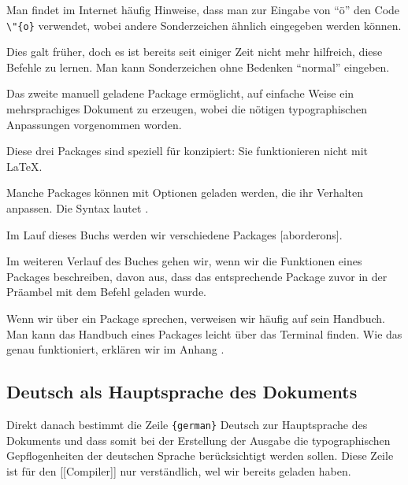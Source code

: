 \begin{plusloins}
Man findet im Internet häufig Hinweise, dass man zur Eingabe von \enquote{ö} den Code \verb|\"{o}| verwendet, wobei andere Sonderzeichen ähnlich eingegeben werden können. 

Dies galt früher, doch es ist bereits seit einiger Zeit nicht mehr hilfreich, diese Befehle zu lernen. Man kann Sonderzeichen ohne Bedenken \enquote{normal} eingeben. 
\end{plusloins}

Das zweite manuell geladene Package  ermöglicht, auf einfache Weise ein mehrsprachiges Dokument zu erzeugen, wobei die nötigen typographischen Anpassungen vorgenommen worden.

Diese drei Packages sind speziell für \XeLaTeX konzipiert: Sie funktionieren nicht mit  \LaTeX.

Manche Packages können mit Optionen geladen werden, die ihr Verhalten anpassen. Die Syntax lautet .

Im Lauf dieses Buchs werden wir verschiedene Packages [aborderons].


\begin{attention}
Im weiteren Verlauf des Buches gehen wir, wenn wir die Funktionen eines Packages beschreiben, davon aus, dass das entsprechende Package zuvor in der Präambel mit dem Befehl  geladen wurde.
\end{attention}

\begin{plusloins}
Wenn wir über ein Package sprechen, verweisen wir häufig auf sein Handbuch. Man kann das Handbuch eines Packages  leicht über das Terminal finden. Wie das genau funktioniert, erklären wir im Anhang .
\end{plusloins}

\subsection{Deutsch als Hauptsprache des Dokuments\label{french}}

Direkt danach bestimmt die Zeile \verb|{german}| Deutsch zur Hauptsprache des Dokuments und dass somit bei der Erstellung der Ausgabe die typographischen Gepflogenheiten der deutschen Sprache berücksichtigt werden sollen. Diese Zeile ist für den [[Compiler]] nur verständlich, wel wir bereits  geladen haben. 

